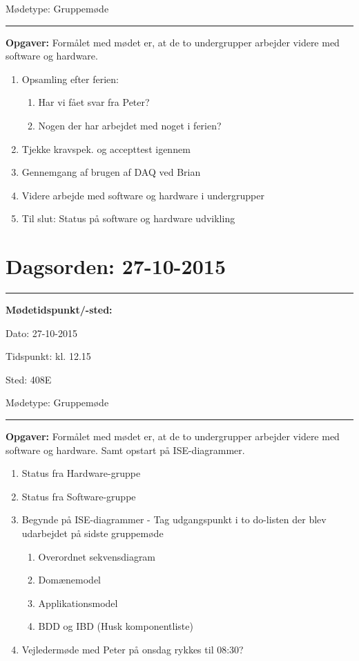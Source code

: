 Mødetype: \tabto{7em} Gruppemøde \newline


\hrule
\textbf{Opgaver:} \newline
Formålet med mødet er, at de to undergrupper arbejder videre med software og hardware.
\begin{enumerate}
\item Opsamling efter ferien:
\begin{enumerate}
\item Har vi fået svar fra Peter?
\item Nogen der har arbejdet med noget i ferien?
\end{enumerate}

\item Tjekke kravspek. og accepttest igennem

\item Gennemgang af brugen af DAQ ved Brian

\item Videre arbejde med software og hardware i undergrupper

\item Til slut: Status på software og hardware udvikling
\end{enumerate}


\newpage
\section{Dagsorden: 27-10-2015}
\hrule



\textbf{Mødetidspunkt/-sted:} 

Dato: \tabto{7em} 27-10-2015

Tidspunkt: \tabto{7em} kl. 12.15

Sted: \tabto{7em} 408E

Mødetype: \tabto{7em} Gruppemøde \newline


\hrule
\textbf{Opgaver:} \newline
Formålet med mødet er, at de to undergrupper arbejder videre med software og hardware. Samt opstart på ISE-diagrammer.
\begin{enumerate}
\item Status fra Hardware-gruppe

\item Status fra Software-gruppe

\item Begynde på ISE-diagrammer - Tag udgangspunkt i to do-listen der blev udarbejdet på sidste gruppemøde
\begin{enumerate}
\item Overordnet sekvensdiagram
\item Domænemodel
\item Applikationsmodel
\item BDD og IBD (Husk komponentliste)
\end{enumerate}

\item Vejledermøde med Peter på onsdag rykkes til 08:30?
\end{enumerate}